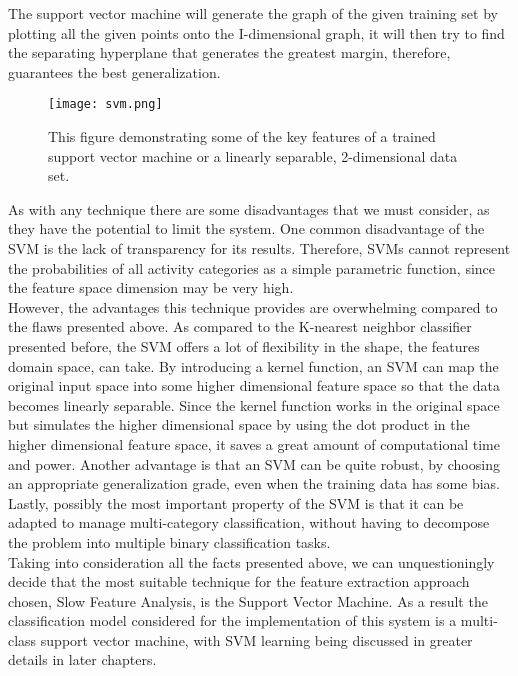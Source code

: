 \documentclass[11pt]{report}
\begin{document}
The support vector machine will generate the graph of the given training set by plotting all the given points onto the I-dimensional graph, it will then try to find the separating hyperplane that generates the greatest margin, therefore, guarantees the best generalization.  \\

\begin{figure}
    \centering
    \texttt{[image: svm.png]}
    \caption{This figure demonstrating some of the key features of a trained support vector machine or a linearly separable, 2-dimensional data set.}
    \label{svm}
\end{figure}

As with any technique there are some disadvantages that we must consider, as they have the potential to limit the system. One common disadvantage of the SVM is the lack of transparency for its results. Therefore, SVMs cannot represent the probabilities of all activity categories as a simple parametric function, since the feature space dimension may be very high. \\
However, the advantages this technique provides are overwhelming compared to the flaws presented above. As compared to the K-nearest neighbor classifier presented before, the SVM offers a lot of flexibility in the shape, the features domain space, can take.  By introducing a kernel function, an SVM can map the original input space into some higher dimensional feature space so that the data becomes linearly separable. Since the kernel function works in the original space but simulates the higher dimensional space by using the dot product in the higher dimensional feature space, it saves a great amount of computational time and power. Another advantage is that an SVM can be quite robust, by choosing an appropriate generalization grade, even when the training data has some bias. Lastly, possibly the most important property of the SVM is that it can be adapted to manage multi-category classification, without having to decompose the problem into multiple binary classification tasks. \cite{SVM}\\

Taking into consideration all the facts presented above, we can unquestioningly decide that the most suitable technique for the feature extraction approach chosen, Slow Feature Analysis, is the Support Vector Machine. As a result the classification model considered for the implementation of this system is a multi-class support vector machine, with SVM learning being discussed in greater details in later chapters. \\
\end{document}
